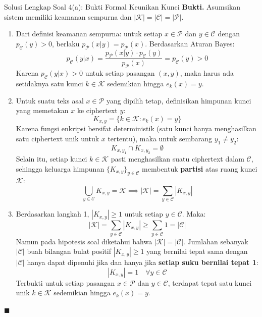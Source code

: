 \documentclass[11pt,a4paper]{article}
\newenvironment{proof}{\noindent\textbf{Bukti.}}{\hfill$\blacksquare$\vspace{0.3em}}
\begin{document}
\begin{solusibox}{Solusi Lengkap Soal 4(a): Bukti Formal Keunikan Kunci}
\begin{proof}
Asumsikan sistem memiliki keamanan sempurna dan $|\mathcal{K}| = |\mathcal{C}| = |\mathcal{P}|$.
\begin{enumerate}
    \item Dari definisi keamanan sempurna: untuk setiap $x \in \mathcal{P}$ dan $y \in \mathcal{C}$ dengan $p_{\mathcal{C}}(y) > 0$, berlaku $p_{\mathcal{P}}(x|y) = p_{\mathcal{P}}(x)$. Berdasarkan Aturan Bayes:
    \[
    p_{\mathcal{C}}(y|x) = \frac{p_{\mathcal{P}}(x|y) \cdot p_{\mathcal{C}}(y)}{p_{\mathcal{P}}(x)} = p_{\mathcal{C}}(y) > 0
    \]
    Karena $p_{\mathcal{C}}(y|x) > 0$ untuk setiap pasangan $(x, y)$, maka harus ada setidaknya satu kunci $k \in \mathcal{K}$ sedemikian hingga $e_k(x) = y$.
    
    \item Untuk suatu teks asal $x \in \mathcal{P}$ yang dipilih tetap, definisikan himpunan kunci yang memetakan $x$ ke ciphertext $y$:
    \[
    K_{x,y} = \{k \in \mathcal{K} : e_k(x) = y\}
    \]
    Karena fungsi enkripsi bersifat deterministik (satu kunci hanya menghasilkan satu ciphertext unik untuk $x$ tertentu), maka untuk sembarang $y_1 \ne y_2$:
    \[
    K_{x,y_1} \cap K_{x,y_2} = \emptyset
    \]
    Selain itu, setiap kunci $k \in \mathcal{K}$ pasti menghasilkan suatu ciphertext dalam $\mathcal{C}$, sehingga keluarga himpunan $\{K_{x,y}\}_{y \in \mathcal{C}}$ membentuk \textbf{partisi} atas ruang kunci $\mathcal{K}$:
    \[
    \bigcup_{y \in \mathcal{C}} K_{x,y} = \mathcal{K} \implies |\mathcal{K}| = \sum_{y \in \mathcal{C}} |K_{x,y}|
    \]
    
    \item Berdasarkan langkah 1, $|K_{x,y}| \ge 1$ untuk setiap $y \in \mathcal{C}$. Maka:
    \[
    |\mathcal{K}| = \sum_{y \in \mathcal{C}} |K_{x,y}| \ge \sum_{y \in \mathcal{C}} 1 = |\mathcal{C}|
    \]
    Namun pada hipotesis soal diketahui bahwa $|\mathcal{K}| = |\mathcal{C}|$. Jumlahan sebanyak $|\mathcal{C}|$ buah bilangan bulat positif $|K_{x,y}| \ge 1$ yang bernilai tepat sama dengan $|\mathcal{C}|$ hanya dapat dipenuhi jika dan hanya jika \textbf{setiap suku bernilai tepat 1}:
    \[
    |K_{x,y}| = 1 \quad \forall y \in \mathcal{C}
    \]
    Terbukti untuk setiap pasangan $x \in \mathcal{P}$ dan $y \in \mathcal{C}$, terdapat tepat satu kunci unik $k \in \mathcal{K}$ sedemikian hingga $e_k(x) = y$.
\end{enumerate}
\end{proof}
\end{solusibox}
\end{document}
